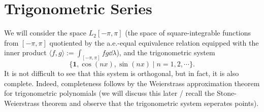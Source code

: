 \documentclass[]{article}
\theoremstyle{definition}
\theoremstyle{definition}
\begin{document}
\newpage
\section{Trigonometric Series}

We will consider the space \(L_2[-\pi, \pi]\) (the space of square-integrable functions 
from \([-\pi, \pi]\) quotiented by the a.e.-equal equivalence relation equipped with 
the inner product \(\langle f, g\rangle := \int_{[-\pi, \pi]} fg \dd\lambda\)), and the 
trigonometric system 
\[\{\mathbf{1}, \cos(n x), \sin(n x) \mid n = 1, 2, \cdots\}.\]
It is not difficult to see that this system is orthogonal, but in fact, it is 
also complete. Indeed, completeness follows by the Weierstrass approximation theorem 
for trigonometric polynomials (we will discuss this later / recall the Stone-Weierstrass 
theorem and observe that the trigonometric system seperates points).
\end{document}
